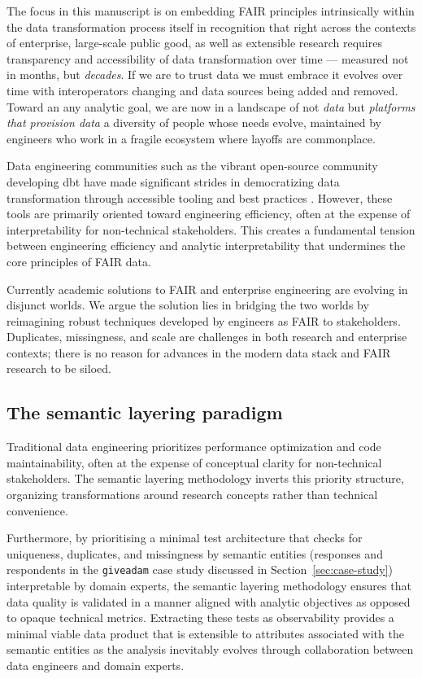 \documentclass{article}
\begin{document}
The focus in this manuscript is on embedding FAIR principles intrinsically within the data transformation process itself in recognition that right across the contexts of enterprise, large-scale public good, as well as extensible research requires transparency and accessibility of data transformation over time --- measured not in months, but \textit{decades}. If we are to trust data we must embrace it evolves over time with interoperators changing and data sources being added and removed. Toward an any analytic goal, we are now in a landscape of not \textit{data} but \textit{platforms that provision data} a diversity of people whose needs evolve, maintained by engineers who work in a fragile ecosystem where layoffs are commonplace.

Data engineering communities such as the vibrant open-source community developing dbt \cite{dbt_core} have made significant strides in democratizing data transformation through accessible tooling and best practices \cite{dbt_docs_structure}. However, these tools are primarily oriented toward engineering efficiency, often at the expense of interpretability for non-technical stakeholders. This creates a fundamental tension between engineering efficiency and analytic interpretability that undermines the core principles of FAIR data. 

Currently academic solutions to FAIR and enterprise engineering are evolving in disjunct worlds. We argue the solution lies in bridging the two worlds by reimagining robust techniques developed by engineers as FAIR to stakeholders. Duplicates, missingness, and scale are challenges in both research and enterprise contexts; there is no reason for advances in the modern data stack and FAIR research to be siloed.

\subsection{The semantic layering paradigm}
\label{subsec:semantic-paradigm}

Traditional data engineering prioritizes performance optimization and code maintainability, often at the expense of conceptual clarity for non-technical stakeholders. The semantic layering methodology inverts this priority structure, organizing transformations around research concepts rather than technical convenience. 

Furthermore, by prioritising a minimal test architecture that checks for uniqueness, duplicates, and missingness by semantic entities (responses and respondents in the \texttt{giveadam} case study discussed in Section~\ref{sec:case-study}) interpretable by domain experts, the semantic layering methodology ensures that data quality is validated in a manner aligned with analytic objectives as opposed to opaque technical metrics. Extracting these tests as observability provides a minimal viable data product that is extensible to attributes associated with the semantic entities as the analysis inevitably evolves through collaboration between data engineers and domain experts.
\end{document}
